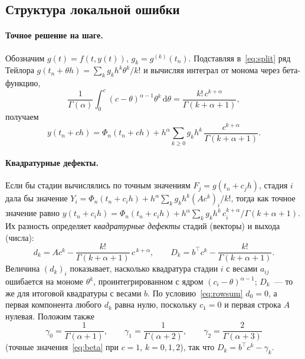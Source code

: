 \documentclass[11pt,a4paper]{article}
\theoremstyle{plain}
\theoremstyle{definition}
\newcommand{\G}{\Gamma}
\newcommand{\dd}{\,\mathrm{d}}
\begin{document}
\subsection{Структура локальной ошибки}

\paragraph{Точное решение на шаге.} Обозначим $g(t)=f(t,y(t))$, $g_k=g^{(k)}(t_n)$. Подставляя в~\eqref{eq:split} ряд Тейлора $g(t_n+\theta h)=\sum_kg_kh^k\theta^k/k!$ и вычисляя интеграл от монома через бета-функцию,
\begin{equation}\label{eq:beta}
\frac{1}{\G(\alpha)}\int_0^{c}(c-\theta)^{\alpha-1}\theta^k\dd\theta=\frac{k!\,c^{k+\alpha}}{\G(k+\alpha+1)},
\end{equation}
получаем
\[
y(t_n+ch)=\Phi_n(t_n+ch)+h^{\alpha}\sum_{k\ge0}g_kh^k\,\frac{c^{k+\alpha}}{\G(k+\alpha+1)} .
\]

\paragraph{Квадратурные дефекты.} Если бы стадии вычислялись по точным значениям $F_j=g(t_n+c_jh)$, стадия $i$ дала бы значение $Y_i=\Phi_n(t_n+c_ih)+h^{\alpha}\sum_kg_kh^k(Ac^k)_i/k!$, тогда как точное значение равно $y(t_n+c_ih)=\Phi_n(t_n+c_ih)+h^{\alpha}\sum_kg_kh^k\,c_i^{k+\alpha}/\G(k+\alpha+1)$. Их разность определяет \emph{квадратурные дефекты} стадий (векторы) и выхода (числа):
\begin{equation}\label{eq:defects}
d_{k}=Ac^{k}-\frac{k!}{\G(k+\alpha+1)}\,c^{\,k+\alpha},\qquad
D_k=b^{\top}c^{k}-\frac{k!}{\G(k+\alpha+1)} .
\end{equation}
Величина $(d_k)_i$ показывает, насколько квадратура стадии $i$ с весами $a_{ij}$ ошибается на мономе $\theta^k$, проинтегрированном с ядром $(c_i-\theta)^{\alpha-1}$; $D_k$~--- то же для итоговой квадратуры с весами $b$. По условию~\eqref{eq:rowsum} $d_0=0$, а первая компонента любого $d_k$ равна нулю, поскольку $c_1=0$ и первая строка $A$ нулевая. Положим также
\[
\gamma_0=\frac{1}{\G(\alpha+1)},\qquad\gamma_1=\frac{1}{\G(\alpha+2)},\qquad\gamma_2=\frac{2}{\G(\alpha+3)}
\]
(точные значения~\eqref{eq:beta} при $c=1$, $k=0,1,2$), так что $D_k=b^{\top}c^k-\gamma_k$.
\end{document}

